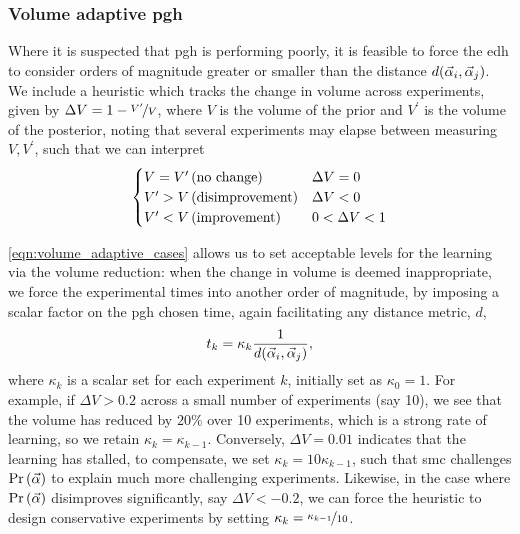 \subsubsection{Volume adaptive \gls{pgh}}
Where it is suspected that \gls{pgh} is performing poorly, it is feasible to force the \gls{edh} to consider orders of magnitude 
    greater or smaller than the distance $d(\vec{\alpha}_i, \vec{\alpha}_j)$.
We include a heuristic which tracks the change in volume across experiments, 
    given by $\Delta V = 1 - \nicefrac{V^{\prime}}{V}$, where $V$ is the volume of the prior
    and $V^{\prime}$ is the volume of the posterior, 
    noting that several experiments may elapse between measuring $V, V^{\prime}$,
    such that we can interpret
\begin{align}
    \label{eqn:volume_adaptive_cases}
    \begin{cases}
        V = V^{\prime} \left( \textrm{no change} \right)  & \Delta V = 0   \\
        V^{\prime} > V  \left( \textrm{disimprovement} \right)  & \Delta V < 0  \\ 
        V^{\prime} < V \left( \textrm{improvement} \right)   & 0 < \Delta V < 1\\ 
    \end{cases}
\end{align}

\cref{eqn:volume_adaptive_cases} allows us to set acceptable levels for the learning via the volume reduction: 
    when the change in volume is deemed inappropriate, we force the experimental times into another order of magnitude, 
    by imposing a scalar factor on the \gls{pgh} chosen time, again facilitating any distance metric, $d$, 
\begin{equation}
    \label{eqn:volume_adaptive_pgh}
    t_k = \kappa_k \frac{1}{d(\vec{\alpha}_i, \vec{\alpha}_j)},
\end{equation}
    where $\kappa_k$ is a scalar set for each experiment $k$, initially set as $\kappa_0=1$.
For example, if $\Delta V > 0.2$ across a small number of experiments (say 10), 
    we see that the volume has reduced by $20\%$ over 10 experiments, which is a strong rate of learning, 
    so we retain $\kappa_k = \kappa_{k-1}$. 
Conversely, $\Delta V = 0.01$ indicates that the learning has stalled, 
    to compensate, we set $\kappa_{k} = 10 \kappa_{k-1}$, 
    such that \gls{smc} challenges $\Pr\left(\vec{\alpha}\right)$ to explain much more challenging experiments.
Likewise, in the case where $\Pr\left(\vec{\alpha}\right)$ disimproves significantly, say $\Delta V < -0.2$, 
    we can force the heuristic to design conservative experiments by setting $\kappa_k = \nicefrac{\kappa_{k-1}}{10}$. 


